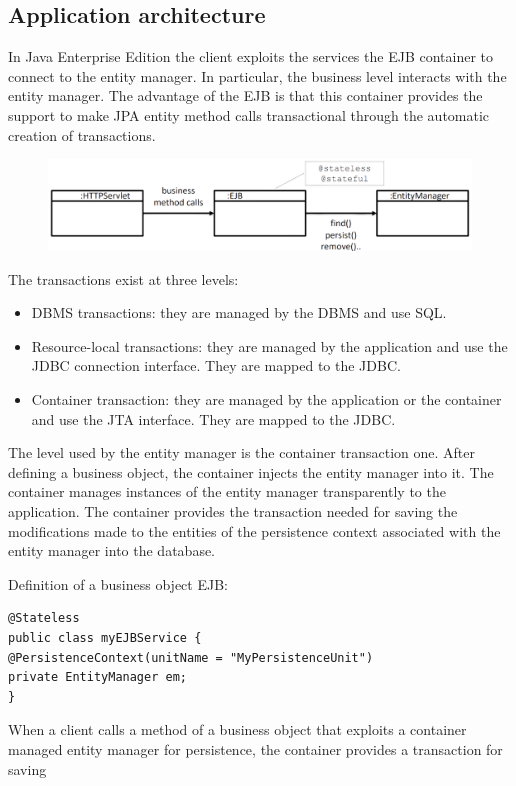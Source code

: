 \subsection*{Application architecture}
In Java Enterprise Edition the client exploits the services the EJB container to connect to the entity manager. In particular, the business level interacts with 
the entity manager. The advantage of the EJB is that this container provides the support to make JPA entity method calls transactional through the automatic creation 
of transactions. 
\begin{figure}[H]
    \centering
    \includegraphics[width=0.75\linewidth]{images/jee1.png}
\end{figure}
The transactions exist at three levels: 
\begin{itemize}
    \item DBMS transactions: they are managed by the DBMS and use SQL. 
    \item Resource-local transactions: they are managed by the application and use the JDBC connection interface. They are mapped to the JDBC. 
    \item Container transaction: they are managed by the application or the container and use the JTA interface. They are mapped to the JDBC. 
\end{itemize}
The level used by the entity manager is the container transaction one. After defining a business object, the container injects the entity manager into it. The 
container manages instances of the entity manager transparently to the application. The container provides the transaction needed for saving the modifications made 
to the entities of the persistence context associated with the entity manager into the database. 
\begin{example}
    Definition of a business object EJB: 
    \begin{lstlisting}[style=Java]
@Stateless 
public class myEJBService {
@PersistenceContext(unitName = "MyPersistenceUnit")
private EntityManager em; 
}
    \end{lstlisting}
\end{example}
When a client calls a method of a business object that exploits a container managed entity manager for persistence, the container provides a transaction for saving 

